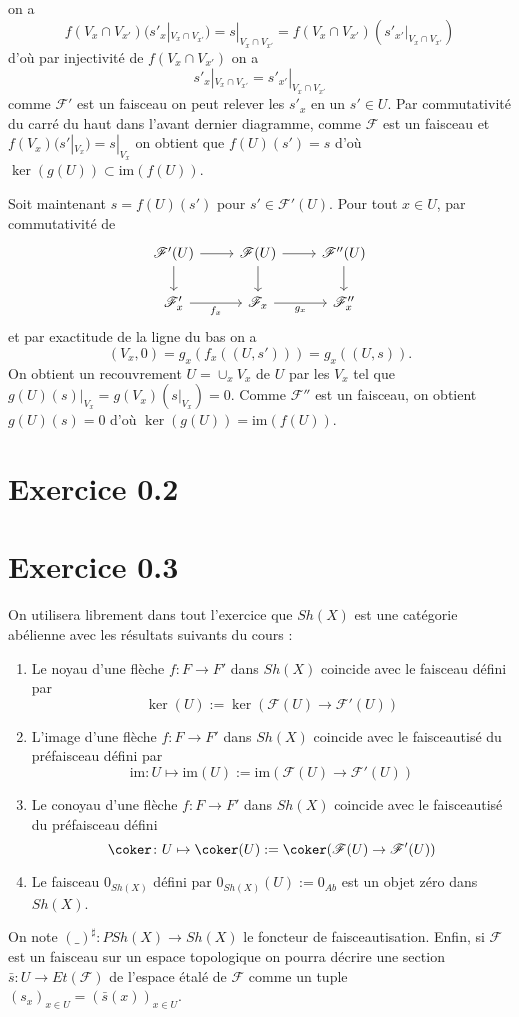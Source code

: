 \documentclass[a4paper,12pt]{article}
\newcommand{\F}{\mathscr F}
\newcommand{\im}{\textrm{im}}
\theoremstyle{plain}
\theoremstyle{definition}
\theoremstyle{remark}
\begin{document}
on a 
\[f(V_x\cap V_{x'})(s'_x|_{V_x\cap V_{x'}})=s|_{V_x\cap V_{x'}}=
f(V_x\cap V_{x'})(s'_{x'}|_{V_x\cap V_{x'}})\]
d'où par injectivité de $f(V_x\cap V_{x'})$ on a 
\[s'_x|_{V_x\cap V_{x'}}=s'_{x'}|_{V_x\cap V_{x'}}\]
comme $\F'$ est un faisceau on peut relever les $s'_x$ en un $s'\in U$.
Par commutativité du carré du haut dans l'avant dernier diagramme, comme
$\F$ est un faisceau et $f(V_x)(s'|_{V_x})=s|_{V_x}$ on obtient que
$f(U)(s')=s$ d'où $\ker(g(U))\subset \im(f(U))$. 

Soit maintenant $s=f(U)(s')$ pour $s'\in \F'(U)$. Pour tout $x\in U$,
par commutativité de 
\[\begin{tikzcd}
	{\F'(U)} & {\F(U)} & {\F''(U)} \\
	{\F'_x} & {\F_x} & {\F''_x}
	\arrow[from=1-1, to=1-2]
	\arrow[from=1-1, to=2-1]
	\arrow[from=1-2, to=1-3]
	\arrow[from=1-2, to=2-2]
	\arrow[from=1-3, to=2-3]
	\arrow["{f_x}"', from=2-1, to=2-2]
	\arrow["{g_x}"', from=2-2, to=2-3]
\end{tikzcd}\]
et par exactitude de la ligne du bas on a 
\[(V_x,0)=g_x(f_x((U,s')))=g_x((U,s)).\]
On obtient un recouvrement 
$U=\cup_x V_x$ de $U$ par les $V_x$ tel que 
$g(U)(s)|_{V_x}=g(V_x)(s|_{V_x})=0$.
Comme $\F''$ est un faisceau, on obtient $g(U)(s)=0$ d'où 
$\ker(g(U))=\im(f(U))$.

\section*{Exercice 0.2}

\section*{Exercice 0.3}
On utilisera librement dans tout l'exercice que $Sh(X)$ est une
catégorie abélienne avec les résultats suivants du cours : 
\begin{enumerate}
	\item Le noyau d'une flèche $f\colon F\to F'$ dans $Sh(X)$
		coincide avec le faisceau défini par 
		\[\ker(U):=\ker(\F(U)\to\F'(U))\]
	\item L'image d'une flèche $f\colon F\to F'$ dans $Sh(X)$
		coincide avec le faisceautisé du préfaisceau défini
		par
		\[\im\colon U\mapsto \im(U):=\im(\F(U)\to\F'(U))\]
	\item Le conoyau d'une flèche $f\colon F\to F'$ dans $Sh(X)$
		coincide avec le faisceautisé du préfaisceau défini
		\[\coker\colon U\mapsto \coker(U):=\coker(\F(U)\to\F'(U))\]
	\item Le faisceau $0_{Sh(X)}$ défini par $0_{Sh(X)}(U):= 0_{Ab}$
		est un objet zéro dans $Sh(X)$.
\end{enumerate}
On note $(\_)^\sharp\colon PSh(X)\to Sh(X)$ le foncteur de 
faisceautisation. Enfin, si $\F$ est un faisceau sur un espace 
topologique on pourra décrire une section $\bar s\colon U\to Et(\F)$ 
de l'espace étalé de $\F$ comme un tuple 
$(s_x)_{x\in U}=(\bar s(x))_{x\in U}$.
\end{document}
